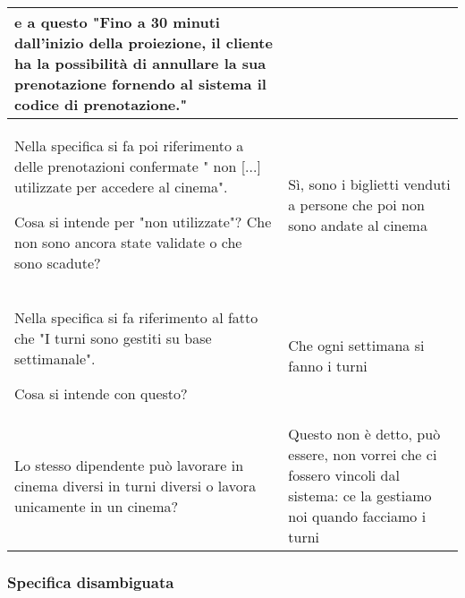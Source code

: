 \begin{longtable}{|p{8.15cm}|p{8.15cm}|}
    e a questo "Fino a 30 minuti dall'inizio della proiezione, il cliente ha
    la possibilità di annullare la sua prenotazione fornendo al sistema il
    codice di prenotazione."
    \\\hline
    Nella specifica si fa poi riferimento a delle
    prenotazioni confermate " non  [...] utilizzate per accedere al cinema".

    Cosa si intende per "non utilizzate"? Che non sono ancora state
    validate o che sono scadute?
     & Sì, sono i biglietti venduti a persone che poi non sono andate al cinema
    \\\hline
    Nella specifica si fa riferimento al fatto che
    "I turni sono gestiti su base settimanale".

    Cosa si intende con questo?
     & Che ogni settimana si fanno i turni
    \\\hline
    Lo stesso dipendente può lavorare in cinema diversi in turni diversi o
    lavora unicamente in un cinema?
     & Questo non è detto, può essere, non vorrei che ci fossero vincoli dal
    sistema: ce la gestiamo noi quando facciamo i turni
    \\\hline
\end{longtable}

\subsubsection*{Specifica disambiguata}


